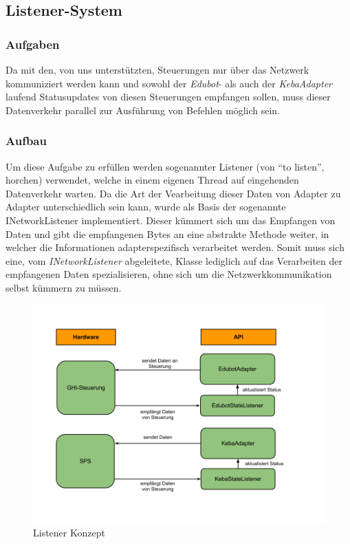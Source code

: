 \subsection{Listener-System}

\subsubsection{Aufgaben}
Da mit den, von uns unterstützten, Steuerungen nur über das Netzwerk kommuniziert werden kann und sowohl der  \textit{Edubot}- als auch der  \textit{KebaAdapter} laufend Statusupdates von diesen Steuerungen empfangen sollen, muss dieser Datenverkehr parallel zur Ausführung von Befehlen möglich sein.

\subsubsection{Aufbau}
Um diese Aufgabe zu erfüllen werden sogenannter Listener (von “to listen”, horchen) verwendet, welche in einem eigenen Thread auf eingehenden Datenverkehr warten. Da die Art der Vearbeitung dieser Daten von Adapter zu Adapter unterschiedlich sein kann, wurde als Basis der sogenannte INetworkListener implementiert. Dieser kümmert sich um das Empfangen von Daten und gibt die empfangenen Bytes an eine abstrakte Methode weiter, in welcher die Informationen adapterspezifisch verarbeitet werden. Somit muss sich eine, vom  \textit{INetworkListener} abgeleitete, Klasse lediglich auf das Verarbeiten der empfangenen Daten spezialisieren, ohne sich um die Netzwerkkommunikation selbst kümmern zu müssen.

\begin{figure}[H]
  \centering
  \begin{minipage}[t]{12 cm}
  	\centering
  	\includegraphics[width=12cm]{images/ListenerSystem} 
    \caption{Listener Konzept}
  \end{minipage}
\end{figure}

